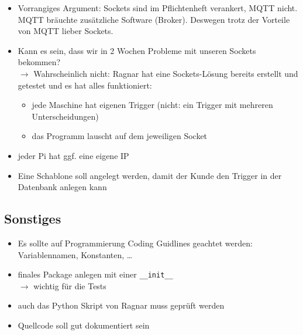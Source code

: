 \documentclass{scrartcl}
\begin{document}
\begin{itemize}
\item Vorrangiges Argument: Sockets sind im Pflichtenheft verankert, MQTT nicht. MQTT bräuchte zusätzliche Software (Broker). Deswegen trotz der Vorteile von MQTT lieber Sockets.
\item Kann es sein, dass wir in 2 Wochen Probleme mit unseren Sockets bekommen?\\
$\to$ Wahrscheinlich nicht: Ragnar hat eine Sockets-Lösung bereits erstellt und getestet und es hat alles funktioniert:
\begin{itemize}
\item jede Maschine hat eigenen Trigger (nicht: ein Trigger mit mehreren Unterscheidungen)
\item das Programm lauscht auf dem jeweiligen Socket
\end{itemize}
\item jeder Pi hat ggf. eine eigene IP
\item Eine Schablone soll angelegt werden, damit der Kunde den Trigger in der Datenbank anlegen kann
\end{itemize}

\subsection{Sonstiges}
\begin{itemize}
\item Es sollte auf Programmierung Coding Guidlines geachtet werden:\\
Variablennamen, Konstanten, …
\item finales Package anlegen mit einer \lstinline`__init__`\\
$\to$ wichtig für die Tests
\item auch das Python Skript von Ragnar muss geprüft werden
\item Quellcode soll gut dokumentiert sein
\end{itemize}
\end{document}
